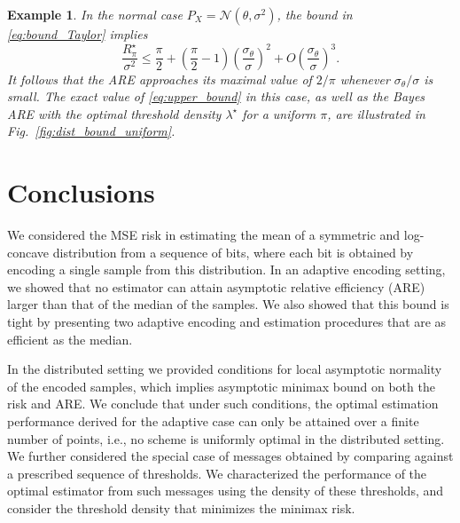\documentclass[letterpaper, 11pt]{IEEEtran}      %
\newtheorem{example}{\bf {Example}}
\newcommand{\Ncal}{\mathcal{N}}
\begin{document}
\begin{example} \label{ex:bound}
In the normal case $P_X = \Ncal(\theta, \sigma^2)$, the bound in \eqref{eq:bound_Taylor} implies 
\[
\frac{R^\star_\pi}{\sigma^2}  \leq \frac{\pi}{2} + \left( \frac{\pi}{2} -1 \right) \left( \frac{ \sigma_\theta}{\sigma} \right)^2 + O \left(  \frac{\sigma_\theta} { \sigma} \right)^3. 
\]
It follows that the ARE approaches its maximal value of $2/\pi$ whenever $\sigma_\theta/\sigma$ is small. The exact value of \eqref{eq:upper_bound} in this case, as well as the Bayes ARE with the optimal threshold density $\lambda^\star$ for a uniform $\pi$, are illustrated in Fig.~\ref{fig:dist_bound_uniform}. 
\end{example}

\section{Conclusions \label{sec:conclusions}}
We considered the MSE risk in estimating the mean of a symmetric and log-concave distribution from a sequence of bits, where each bit is obtained by encoding a single sample from this distribution. 
%
In an adaptive encoding setting, we showed that no estimator can attain asymptotic relative efficiency (ARE) larger than that of the median of the samples. We also showed that this bound is tight by presenting two adaptive encoding and estimation procedures that are as efficient as the median. 
\par
In the distributed setting we provided conditions for local asymptotic normality of the encoded samples, which implies asymptotic minimax bound on both the risk and ARE. 
%
We conclude that under such conditions, the optimal estimation performance derived for the adaptive case can only be attained over a finite number of points, i.e., no scheme is uniformly optimal in the distributed setting. 
%
We further considered the special case of messages obtained by comparing against a prescribed sequence of thresholds. We characterized the performance of the optimal estimator from such messages using the density of these thresholds, and consider the threshold density that minimizes the minimax risk.
 \\
\end{document}
